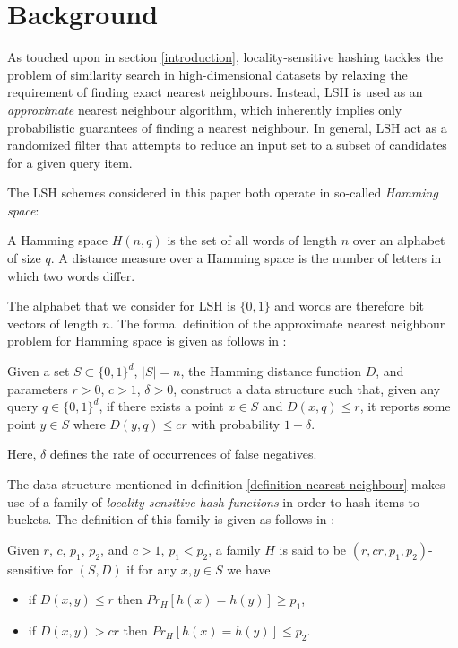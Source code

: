 \section{Background}
\label{background}

As touched upon in section \ref{introduction}, locality-sensitive hashing tackles the problem of similarity search in high-dimensional datasets by relaxing the requirement of finding exact nearest neighbours. Instead, LSH is used as an \textit{approximate} nearest neighbour algorithm, which inherently implies only probabilistic guarantees of finding a nearest neighbour. In general, LSH act as a randomized filter that attempts to reduce an input set to a subset of candidates for a given query item.

The LSH schemes considered in this paper both operate in so-called \textit{Hamming space}:

\begin{definition}
\label{definition-hamming-space}
  A Hamming space $H(n, q)$ is the set of all words of length $n$ over an alphabet of size $q$. A distance measure over a Hamming space is the number of letters in which two words differ.
\end{definition}

The alphabet that we consider for LSH is $\{0, 1\}$ and words are therefore bit vectors of length $n$. The formal definition of the approximate nearest neighbour problem for Hamming space is given as follows in \cite{DBLP:journals/corr/PhamP16}:

\begin{definition}
\label{definition-nearest-neighbour}
  Given a set $S \subset \{0, 1\}^d$, $|S| = n$, the Hamming distance function $D$, and parameters $r > 0$, $c > 1$, $\delta > 0$, construct a data structure such that, given any query $q \in \{0,1\}^d$, if there exists a point $x \in S$ and $D(x, q) \leq r$, it reports some point $y \in S$ where $D(y, q) \leq cr$ with probability $1 - \delta$.
\end{definition}

Here, $\delta$ defines the rate of occurrences of false negatives.

The data structure mentioned in definition \ref{definition-nearest-neighbour} makes use of a family of \textit{locality-sensitive hash functions} in order to hash items to buckets. The definition of this family is given as follows in \cite{DBLP:conf/stoc/IndykM98}:

\begin{definition}
\label{definition-hash-functions}
  Given $r$, $c$, $p_1$, $p_2$, and $c > 1$, $p_1 < p_2$, a family $H$ is said to be $(r, cr, p_1, p_2)$-sensitive for $(S, D)$ if for any $x, y \in S$ we have

  \begin{itemize}
    \item if $D(x, y) \leq r$ then $Pr_H [h(x) = h(y)] \geq p_1$,
    \item if $D(x, y) > cr$ then $Pr_H [h(x) = h(y)] \leq p_2$.
  \end{itemize}
\end{definition}

